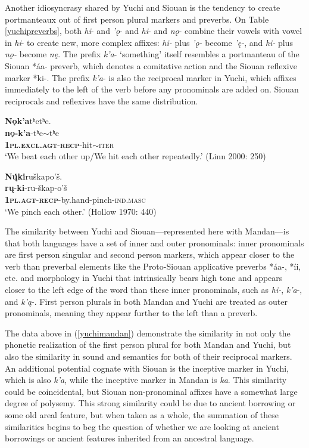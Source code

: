 \documentclass[output=paper]{LSP/langsci}
\begin{document}
Another idiosyncrasy shared by Yuchi and Siouan is the tendency to create portmanteaux out of first person plural markers and preverbs. On Table \ref{yuchipreverbs}, both \emph{hi}- and \emph{'\k{o}}- and \emph{hi}- and \emph{n\k{o}}- combine their vowels with vowel in \emph{hi}- to create new, more complex affixes: \emph{hi-} plus \emph{'\k{o}-} become \emph{'\k{e}-}, and \emph{hi-} plus \emph{n\k{o}-} become \emph{n\k{e}}. The prefix \emph{k'a}- `something' itself resembles a portmanteau of the Siouan *\'aa- preverb, which denotes a comitative action and the Siouan reflexive marker *ki-. The prefix \emph{k'a}- is also the reciprocal marker in Yuchi, which affixes immediately to the left of the verb before any pronominals are added on. Siouan reciprocals and reflexives have the same distribution.

\ea \label{yuchimandan}
	\ea
	\glll  \textbf{N\k{o}k'a}tʰetʰe.\\ 
	\textbf{n\k{o}-k'a}-tʰe$\sim$tʰe\\
			\textbf{\textsc{1pl.excl.agt}}-\textbf{\textsc{recp}}-hit$\sim$\textsc{iter}\\ 
	\glt `We beat each other up/We hit each other repeatedly.' (Linn 2000: 250)
	
	\ex  
	\glll \textbf{N\k{\'u}ki}ru\v{s}kapo'\v{s}. \\ 
	\textbf{r\k{u}}-\textbf{ki}-ru-\v{s}kap-o'\v{s}\\
			\textbf{\textsc{1pl.agt}}-\textbf{\textsc{recp}}-by.hand-pinch-\textsc{ind.masc}\\ 
	\glt `We pinch each other.' (Hollow 1970: 440)
\z
\z

The similarity between Yuchi and Siouan---represented here with Mandan---is that both languages have a set of inner and outer pronominals: inner pronominals are first person singular and second person markers, which appear closer to the verb than preverbal elements like the Proto-Siouan applicative preverbs *\'aa-, *\'ii, etc. and morphology in Yuchi that intrinsically bears high tone and appears closer to the left edge of the word than these inner pronominals, such as \emph{hi-}, \emph{k'a}-, and \emph{k'\k{a}}-. First person plurals in both Mandan and Yuchi are treated as outer pronominals, meaning they appear further to the left than a preverb.

The data above in (\ref{yuchimandan}) demonstrate the similarity in not only the phonetic realization of the first person plural for both Mandan and Yuchi, but also the similarity in sound and semantics for both of their reciprocal markers. An additional potential cognate with Siouan is the inceptive marker in Yuchi, which is also \emph{k'a}, while the inceptive marker in Mandan is \emph{ka}. This similarity could be coincidental, but Siouan non-pronominal affixes have a somewhat large degree of polysemy.  This strong similarity could be due to ancient borrowing or some old areal feature, but when taken as a whole, the summation of these similarities begins to beg the question of whether we are looking at ancient borrowings or ancient features inherited from an ancestral language. 
\end{document}
